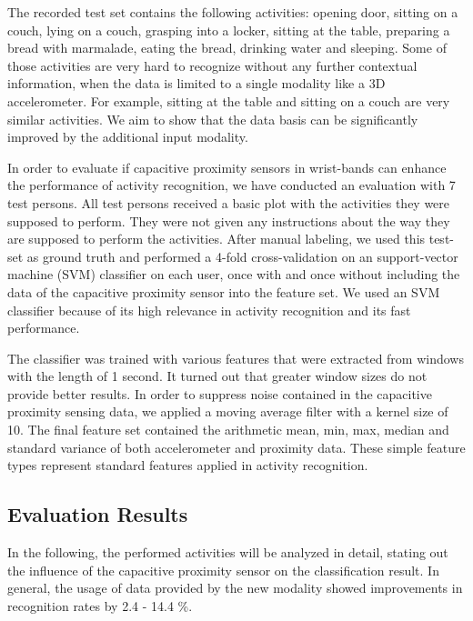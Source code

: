 \documentclass[runningheads,a4paper]{llncs}
\begin{document}
The recorded test set contains the following activities: opening door, sitting on a couch, lying on a couch, grasping into a locker, sitting at the table, preparing a bread with marmalade, eating the bread, drinking water and sleeping. Some of those activities are very hard to recognize without any further contextual information, when the data is limited to a single modality like a 3D accelerometer. For example, sitting at the table and sitting on a couch are very similar activities. We aim to show that the data basis can be significantly improved by the additional input modality. 

In order to evaluate if capacitive proximity sensors in wrist-bands can enhance the performance of activity recognition, we have conducted an evaluation with 7 test persons. All test persons received a basic plot with the activities they were supposed to perform. They were not given any instructions about the way they are supposed to perform the activities. After manual labeling, we used this test-set as ground truth and performed a 4-fold cross-validation on an support-vector machine (SVM) classifier on each user, once with and once without including the data of the capacitive proximity sensor into the feature set. We used an SVM classifier because of its high relevance in activity recognition and its fast performance. 

The classifier was trained with various features that were extracted from windows with the length of 1 second. It turned out that greater window sizes do not provide better results. In order to suppress noise contained in the capacitive proximity sensing data, we applied a moving average filter with a kernel size of 10. The final feature set contained the arithmetic mean, min, max, median and standard variance of both accelerometer and proximity data. These simple feature types represent standard features applied in activity recognition. 

\subsection{Evaluation Results}

In the following, the performed activities will be analyzed in detail, stating out the influence of the capacitive proximity sensor on the classification result. In general, the usage of data provided by the new modality showed improvements in recognition rates by 2.4 - 14.4 \%.
\end{document}
